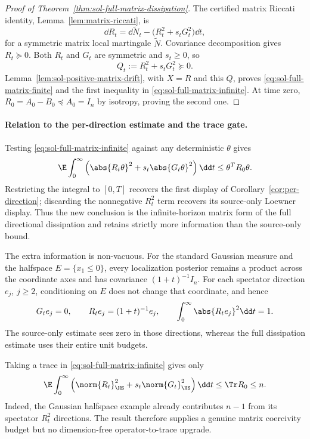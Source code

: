 \documentclass[../main.tex]{subfiles}
\begin{document}
\begin{proof}[Proof of Theorem~\ref{thm:sol-full-matrix-dissipation}]
The certified matrix Riccati identity, Lemma~\ref{lem:matrix-riccati}, is
\begin{equation}
 \dd R_t=\dd\widetilde N_t-\bigl(R_t^2+s_tG_t^2\bigr)\dd t,
 \label{eq:sol-certified-matrix-riccati}
\end{equation}
for a symmetric matrix local martingale $\widetilde N$.  Covariance decomposition gives
$R_t\succeq0$.  Both $R_t$ and $G_t$ are symmetric and $s_t\geq0$, so
\[
 Q_t:=R_t^2+s_tG_t^2\succeq0.
\]
Lemma~\ref{lem:sol-positive-matrix-drift}, with $X=R$ and this $Q$, proves
\eqref{eq:sol-full-matrix-finite} and the first inequality in
\eqref{eq:sol-full-matrix-infinite}.  At time zero,
$R_0=A_0-B_0\preceq A_0=I_n$ by isotropy, proving the second one.
\end{proof}

\paragraph{Relation to the per-direction estimate and the trace gate.}
Testing \eqref{eq:sol-full-matrix-infinite} against any deterministic $\theta$ gives
\begin{equation}
 \E\int_0^\infty
 \left(\abs{R_t\theta}^2+s_t\abs{G_t\theta}^2\right)\dd t
 \leq\theta^TR_0\theta.
 \label{eq:sol-full-matrix-directional}
\end{equation}
Restricting the integral to $[0,T]$ recovers the first display of
Corollary~\ref{cor:per-direction}; discarding the nonnegative $R_t^2$ term recovers its
source-only Loewner display.  Thus the new conclusion is the infinite-horizon matrix form of
the full directional dissipation and retains strictly more information than the source-only
bound.

The extra information is non-vacuous.  For the standard Gaussian measure and the halfspace
$E=\{x_1\leq0\}$, every localization posterior remains a product across the coordinate axes
and has covariance $(1+t)^{-1}I_n$.  For each spectator direction $e_j$, $j\geq2$, conditioning
on $E$ does not change that coordinate, and hence
\[
 G_te_j=0,
 \qquad
 R_te_j=(1+t)^{-1}e_j,
 \qquad
 \int_0^\infty\abs{R_te_j}^2\dd t=1.
\]
The source-only estimate sees zero in those directions, whereas the full dissipation estimate
uses their entire unit budgets.

Taking a trace in \eqref{eq:sol-full-matrix-infinite} gives only
\begin{equation}
 \E\int_0^\infty
 \left(\norm{R_t}_{\HS}^2+s_t\norm{G_t}_{\HS}^2\right)\dd t
 \leq\Tr R_0\leq n.
 \label{eq:sol-full-matrix-trace}
\end{equation}
Indeed, the Gaussian halfspace example already contributes $n-1$ from its spectator
$R_t^2$ directions.  The result therefore supplies a genuine matrix coercivity budget but no
dimension-free operator-to-trace upgrade.
\end{document}
